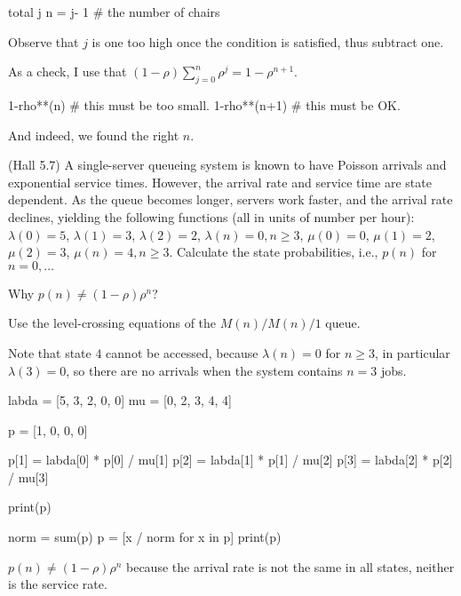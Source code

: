\begin{extra}[Hall 5.6]
\begin{solution}
\begin{pyconsole}
total
j
n = j- 1 # the number of chairs 
\end{pyconsole} 

Observe that $j$ is one too high once the condition is satisfied, thus subtract one.

As a check, I use that $(1-\rho) \sum_{j=0}^n \rho^j = 1-\rho^{n+1}$.

\begin{pyconsole}
1-rho**(n) # this must be too small.
1-rho**(n+1) # this must be OK.
\end{pyconsole} 

And indeed, we found the right $n$.

\end{solution}
\end{extra}

\begin{extra}
 (Hall 5.7) A single-server queueing system is known to have Poisson
 arrivals and exponential service times. However, the arrival rate
 and service time are state dependent. As the queue becomes longer,
 servers work faster, and the arrival rate declines, yielding the
 following functions (all in units of number per hour):
 $\lambda(0) = 5$, $\lambda(1)=3$, $\lambda(2)=2$,
 $\lambda(n)=0, n\geq 3$, $\mu(0) = 0$, $\mu(1)=2$, $\mu(2)=3$, $\mu(n)=4, n\geq 3$. 
 Calculate the state probabilities, i.e., $p(n)$ for $n=0,\ldots$

 Why  $p(n) \neq (1-\rho)\rho^n$?
\begin{hint}
Use the level-crossing equations of the $M(n)/M(n)/1$ queue. 
\end{hint}
\begin{solution}
  Note that state $4$ cannot be accessed, because $\lambda(n)=0$ for $n\geq 3$, in particular $\lambda(3)=0$, so there are no arrivals when the system contains $n=3$ jobs.

\begin{pyconsole}
labda = [5, 3, 2, 0, 0]
mu = [0, 2, 3, 4, 4]

p = [1, 0, 0, 0]

p[1] = labda[0] * p[0] / mu[1]
p[2] = labda[1] * p[1] / mu[2]
p[3] = labda[2] * p[2] / mu[3]

print(p)

norm = sum(p)
p = [x / norm for x in p]
print(p)
\end{pyconsole}


$p(n) \neq (1-\rho)\rho^n$ because the arrival rate is not the same in all states, neither is the service rate.


\end{solution}
\end{extra}

